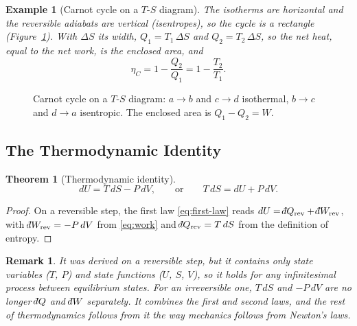 \documentclass{article}
\newtheorem{theorem}{Theorem}
\newtheorem*{example}{Example}
\newtheorem{remark}{Remark}
\newcommand{\dbar}{\mathchar'26\mkern-12mu d}
\begin{document}
\begin{example}[Carnot cycle on a $T$-$S$ diagram]
    The isotherms are horizontal and the reversible adiabats are vertical (isentropes), so the cycle is a rectangle (Figure~\ref{fig:carnot-ts}). With $\Delta S$ its width, $Q_1 = T_1\,\Delta S$ and $Q_2 = T_2\,\Delta S$, so the net heat, equal to the net work, is the enclosed area, and
    \[\eta_C = 1 - \frac{Q_2}{Q_1} = 1 - \frac{T_2}{T_1}.\]
\end{example}

\begin{figure}[H]
    \centering
    \caption{Carnot cycle on a $T$-$S$ diagram: $a \to b$ and $c \to d$ isothermal, $b \to c$ and $d \to a$ isentropic. The enclosed area is $Q_1 - Q_2 = W$.}
    \label{fig:carnot-ts}
\end{figure}

\subsection{The Thermodynamic Identity}
\begin{theorem}[Thermodynamic identity]
    \begin{equation}
        \label{eq:thermo-identity}
        dU = T\,dS - P\,dV, \qquad \text{or} \qquad T\,dS = dU + P\,dV.
    \end{equation}
\end{theorem}
\begin{proof}
    On a reversible step, the first law \eqref{eq:first-law} reads $dU = \dbar Q_{\text{rev}} + \dbar W_{\text{rev}}$, with $\dbar W_{\text{rev}} = -P\,dV$ from \eqref{eq:work} and $\dbar Q_{\text{rev}} = T\,dS$ from the definition of entropy.
\end{proof}
\begin{remark}
    It was derived on a reversible step, but it contains only state variables ($T$, $P$) and state functions ($U$, $S$, $V$), so it holds for any infinitesimal process between equilibrium states. For an irreversible one, $T\,dS$ and $-P\,dV$ are no longer $\dbar Q$ and $\dbar W$ separately. It combines the first and second laws, and the rest of thermodynamics follows from it the way mechanics follows from Newton's laws.
\end{remark}
\end{document}
